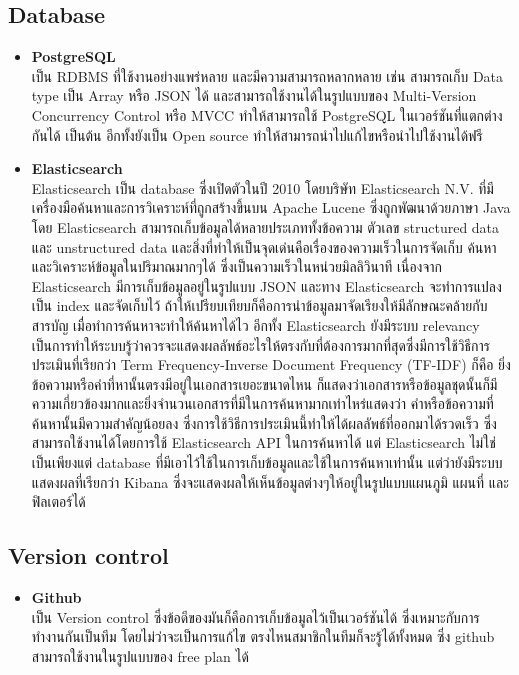 \documentclass[12pt,oneside,openright,a4paper]{cpe-thai-project}
\begin{document}
\subsection{Database}
\begin{itemize}
  \item \textbf{PostgreSQL} \\
\hspace*{1cm} เป็น RDBMS ที่ใช้งานอย่างแพร่หลาย และมีความสามารถหลากหลาย เช่น สามารถเก็บ Data type เป็น Array หรือ JSON ได้ และสามารถใช้งานได้ในรูปแบบของ Multi-Version Concurrency Control หรือ MVCC ทำให้สามารถใช้ PostgreSQL ในเวอร์ชันที่แตกต่างกันได้ เป็นต้น อีกทั้งยังเป็น Open source ทำให้สามารถนำไปแก้ไขหรือนำไปใช้งานได้ฟรี \cite{WhatIsPostgresQL}
  \item \textbf{Elasticsearch} \\
\hspace*{1cm} Elasticsearch \cite{WhatIsElasticsearch, ElasticsearchForSearchEngine} เป็น database ซึ่งเปิดตัวในปี 2010 โดยบริษัท Elasticsearch N.V. ที่มีเครื่องมือค้นหาและการวิเคราะห์ที่ถูกสร้างขึ้นบน Apache Lucene ซึ่งถูกพัฒนาด้วยภาษา Java โดย Elasticsearch สามารถเก็บข้อมูลได้หลายประเภททั้งข้อความ ตัวเลข structured data และ unstructured data และสิ่งที่ทำให้เป็นจุดเด่นคือเรื่องของความเร็วในการจัดเก็บ ค้นหา และวิเคราะห์ข้อมูลในปริมาณมากๆได้ ซึ่งเป็นความเร็วในหน่วยมิลลิวินาที เนื่องจาก Elasticsearch มีการเก็บข้อมูลอยู่ในรูปแบบ JSON และทาง Elasticsearch จะทำการแปลงเป็น index และจัดเก็บไว้ ถ้าให้เปรียบเทียบก็คือการนำข้อมูลมาจัดเรียงให้มีลักษณะคล้ายกับสารบัญ เมื่อทำการค้นหาจะทำให้ค้นหาได้ไว อีกทั้ง Elasticsearch ยังมีระบบ relevancy เป็นการทำให้ระบบรู้ว่าควรจะแสดงผลลัพธ์อะไรให้ตรงกับที่ต้องการมากที่สุดซึ่งมีการใช้วิธีการประเมินที่เรียกว่า Term Frequency-Inverse Document Frequency (TF-IDF) ก็คือ ยิ่งข้อความหรือคำที่หานั้นตรงมีอยู่ในเอกสารเยอะขนาดไหน ก็แสดงว่าเอกสารหรือข้อมูลชุดนั้นก็มีความเกี่ยวข้องมากและยิ่งจำนวนเอกสารที่มีในการค้นหามากเท่าไหร่แสดงว่า คำหรือข้อความที่ค้นหานั้นมีความสำคัญน้อยลง ซึ่งการใช้วิธีการประเมินนี้ทำให้ได้ผลลัพธ์ที่ออกมาได้รวดเร็ว ซึ่งสามารถใช้งานได้โดยการใช้ Elasticsearch API ในการค้นหาได้ แต่ Elasticsearch ไม่ใช่เป็นเพียงแต่ database ที่มีเอาไว้ใช้ในการเก็บข้อมูลและใช้ในการค้นหาเท่านั้น แต่ว่ายังมีระบบแสดงผลที่เรียกว่า Kibana ซึ่งจะแสดงผลให้เห็นข้อมูลต่างๆให้อยู่ในรูปแบบแผนภูมิ แผนที่ และฟิลเตอร์ได้
\end{itemize}
\subsection{Version control}
\begin{itemize}
  \item \textbf{Github} \\
\hspace*{1cm} เป็น Version control ซึ่งข้อดีของมันก็คือการเก็บข้อมูลไว้เป็นเวอร์ชันได้ ซึ่งเหมาะกับการทำงานกันเป็นทีม โดยไม่ว่าจะเป็นการแก้ไข ตรงไหนสมาชิกในทีมก็จะรู้ได้ทั้งหมด ซึ่ง github สามารถใช้งานในรูปแบบของ free plan ได้ \cite{WhatIsGithub}
\end{itemize} 
\end{document}
